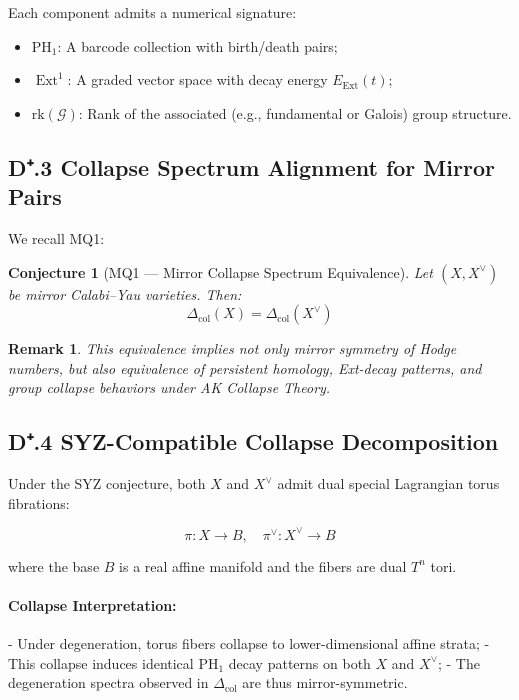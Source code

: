 \documentclass[11pt]{article}
\newtheorem{remark}[theorem]{Remark}
\newtheorem{conjecture}{Conjecture}[section]
\DeclareMathOperator{\Ext}{Ext}
\begin{document}
Each component admits a numerical signature:

\begin{itemize}
    \item $\mathrm{PH}_1$: A barcode collection with birth/death pairs;
    \item $\Ext^1$: A graded vector space with decay energy $E_{\mathrm{Ext}}(t)$;
    \item $\mathrm{rk}(\mathcal{G})$: Rank of the associated (e.g., fundamental or Galois) group structure.
\end{itemize}

\subsection*{D⁺.3 Collapse Spectrum Alignment for Mirror Pairs}

We recall MQ1:

\begin{conjecture}[MQ1 — Mirror Collapse Spectrum Equivalence]
Let $(X, X^{\vee})$ be mirror Calabi--Yau varieties. Then:
\[
\Delta_{\mathrm{col}}(X) = \Delta_{\mathrm{col}}(X^{\vee})
\]
\end{conjecture}

\begin{remark}
This equivalence implies not only mirror symmetry of Hodge numbers, but also equivalence of persistent homology, Ext-decay patterns, and group collapse behaviors under AK Collapse Theory.
\end{remark}

\subsection*{D⁺.4 SYZ-Compatible Collapse Decomposition}

Under the SYZ conjecture, both $X$ and $X^{\vee}$ admit dual special Lagrangian torus fibrations:

\[
\pi : X \rightarrow B, \quad \pi^{\vee} : X^{\vee} \rightarrow B
\]

where the base $B$ is a real affine manifold and the fibers are dual $T^n$ tori.


\paragraph{Collapse Interpretation:}
- Under degeneration, torus fibers collapse to lower-dimensional affine strata;
- This collapse induces identical $\mathrm{PH}_1$ decay patterns on both $X$ and $X^{\vee}$;
- The degeneration spectra observed in $\Delta_{\mathrm{col}}$ are thus mirror-symmetric.
\end{document}
